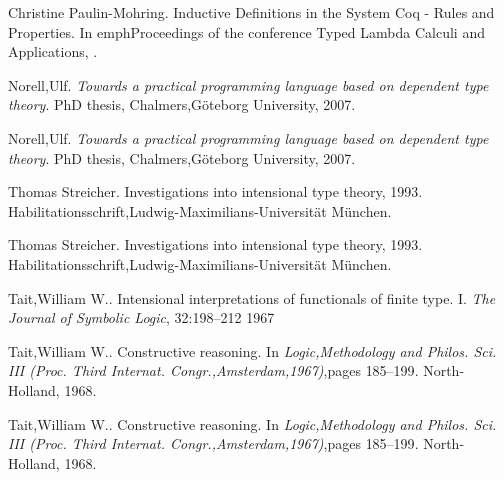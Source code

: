 \documentclass[12pt]{article}
\begin{document}
\begin{thebibliography}{99}
 {Christine Paulin-Mohring}. {{Inductive Definitions in the System {Coq} - Rules and Properties}}. In emph{Proceedings of the conference {T}yped {L}ambda {C}alculi and {A}pplications}, .

 {Norell,Ulf}. \emph{Towards a practical programming language based on dependent type theory}. PhD thesis, {{Chalmers,G\"oteborg University}}, {2007}.

 {Norell,Ulf}. \emph{Towards a practical programming language based on dependent type theory}. PhD thesis, {{Chalmers,G\"oteborg University}}, {2007}.

 {Thomas Streicher}. {Investigations into intensional type theory}, 1993. {Habilitationsschrift,Ludwig-Maximilians-Universit\"at M\"unchen}.

 {Thomas Streicher}. {Investigations into intensional type theory}, 1993. {Habilitationsschrift,Ludwig-Maximilians-Universit\"at M\"unchen}.

 {Tait,William W.}. {Intensional interpretations of functionals of finite type. {I}}. \emph{The Journal of Symbolic Logic}, {32}:{198--212} {1967}

 {Tait,William W.}. {Constructive reasoning}. In \emph{Logic,{M}ethodology and {P}hilos. {S}ci. {III} ({P}roc. {T}hird {I}nternat. {C}ongr.,{A}msterdam,1967)},pages {185--199}. {North-Holland}, {1968}.

 {Tait,William W.}. {Constructive reasoning}. In \emph{Logic,{M}ethodology and {P}hilos. {S}ci. {III} ({P}roc. {T}hird {I}nternat. {C}ongr.,{A}msterdam,1967)},pages {185--199}. {North-Holland}, {1968}.

\end{thebibliography}
\end{document}
